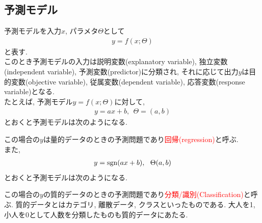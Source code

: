 \documentclass[dvipdfmx,a4j]{jsarticle}
\begin{document}
  \subsection{予測モデル}
  予測モデルを入力$x$, パラメタ$\Theta$として
  \begin{eqnarray*}
    y=f(x;\Theta)
  \end{eqnarray*}
  と表す.\\
  このとき予測モデルの入力は説明変数(explanatory variable), 独立変数(independent variable), 予測変数(predictor)に分類され, それに応じて出力$y$は目的変数(objective variable), 従属変数(dependent variable), 応答変数(response variable)となる. \\
  たとえば, 予測モデル$y=f(x;\Theta)$に対して,
  \begin{eqnarray*}
    y=ax+b,\ \ \Theta = (a,b)
  \end{eqnarray*}
  とおくと予測モデルは次のようになる.
  \begin{center}
    \end{center}
    この場合の$y$は量的データのときの予測問題であり\textcolor{red}{回帰(regression)}と呼ぶ.\\
    また,
    \begin{eqnarray*}
      y={\rm sgn}(ax+b),\ \ \Theta(a,b)
    \end{eqnarray*}
    とおくと予測モデルは次のようになる.
    \begin{center}
      \end{center}
      この場合の$y$の質的データのときの予測問題であり\textcolor{red}{分類/識別(Classification)}と呼ぶ. 質的データとはカテゴリ, 離散データ, クラスといったものである. 大人を1, 小人を0として人数を分類したものも質的データにあたる.
\end{document}
